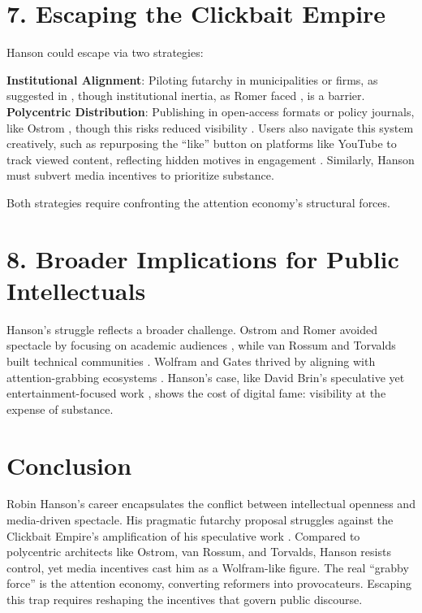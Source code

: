 \documentclass[11pt]{article}
\begin{document}
\section*{7. Escaping the Clickbait Empire}

Hanson could escape via two strategies:

\textbf{Institutional Alignment}: Piloting futarchy in municipalities or firms, as suggested in \citep{ash2021c}, though institutional inertia, as Romer faced \citep{romer2010}, is a barrier. \\
\textbf{Polycentric Distribution}: Publishing in open-access formats or policy journals, like Ostrom \citep{ostrom1990}, though this risks reduced visibility \citep{hanson2022}. Users also navigate this system creatively, such as repurposing the ``like'' button on platforms like YouTube to track viewed content, reflecting hidden motives in engagement \citep{hanson2022}. Similarly, Hanson must subvert media incentives to prioritize substance.

Both strategies require confronting the attention economy’s structural forces.

\section*{8. Broader Implications for Public Intellectuals}

Hanson’s struggle reflects a broader challenge. Ostrom and Romer avoided spectacle by focusing on academic audiences \citep{ostrom1990,romer2010}, while van Rossum and Torvalds built technical communities \citep{vanrossum1991,torvalds1999}. Wolfram and Gates thrived by aligning with attention-grabbing ecosystems \citep{wolfram2002,gates1995}. Hanson’s case, like David Brin’s speculative yet entertainment-focused work \citep{brin1998}, shows the cost of digital fame: visibility at the expense of substance.

\section*{Conclusion}

Robin Hanson’s career encapsulates the conflict between intellectual openness and media-driven spectacle. His pragmatic futarchy proposal \citep{Hanson2013-HANSWV} struggles against the Clickbait Empire’s amplification of his speculative work \citep{hanson2021a,bbc2021}. Compared to polycentric architects like Ostrom, van Rossum, and Torvalds, Hanson resists control, yet media incentives cast him as a Wolfram-like figure. The real ``grabby force'' is the attention economy, converting reformers into provocateurs. Escaping this trap requires reshaping the incentives that govern public discourse.

\newpage
\raggedright


\end{document}
